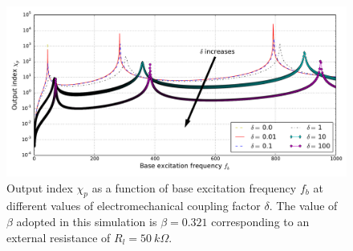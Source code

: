 \documentclass{svjour3}                     %
\begin{document}
\begin{figure}[!htbp]
    \centering
    \includegraphics[width=\textwidth]{./img_eig_asy/fig_sol_analytic_out_index_vs_fr}
    \caption{Output index $\chi_p$ as a function of base excitation frequency $f_b$ at different values of electromechanical coupling factor $\delta$. The value of $\beta$ adopted in this simulation is $\beta = 0.321$ corresponding to an external resistance of $R_l = 50\ k\Omega$. }
    \label{fig:fig_sol_analytic_out_index_vs_fr}
\end{figure}
\end{document}
